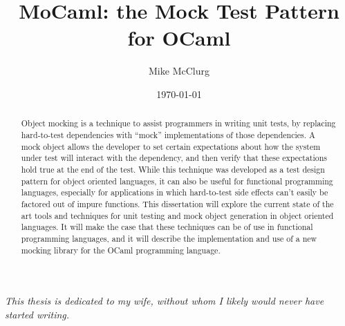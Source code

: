 \documentclass[dissertation,a4paper]{softeng}
\title{MoCaml: the Mock Test Pattern for OCaml}
\author{Mike McClurg}
\date{\today}
\begin{document}
\maketitle

\begin{abstract}

  Object mocking is a technique to assist programmers in writing unit
  tests, by replacing hard-to-test dependencies with ``mock''
  implementations of those dependencies. A mock object allows the
  developer to set certain expectations about how the system under
  test will interact with the dependency, and then verify that these
  expectations hold true at the end of the test. While this technique
  was developed as a test design pattern for object oriented
  languages, it can also be useful for functional programming
  languages, especially for applications in which hard-to-test side
  effects can't easily be factored out of impure functions. This
  dissertation will explore the current state of the art tools and
  techniques for unit testing and mock object generation in object
  oriented languages. It will make the case that these techniques can
  be of use in functional programming languages, and it will describe
  the implementation and use of a new mocking library for the OCaml
  programming language.


\end{abstract}

\newpage


\vspace*{\fill}
\begin{centering}
  \textit{This thesis is dedicated to my wife, without whom I likely
    would never have started writing.}
\end{centering}
\vspace*{\fill}

\newpage

\tableofcontents

\newpage

\listoffigures








\end{document}
